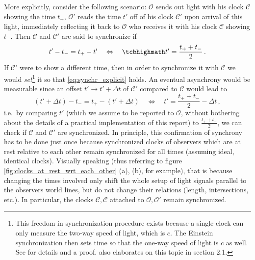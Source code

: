 More explicitly, consider the following scenario: $\mathcal{O}$ sends out light with his clock $\mathcal{C}$ showing the time $t_+$, $\mathcal{O}'$ reads the time $t'$ off of his clock $\mathcal{C}'$ upon arrival of this light, immediately reflecting it back to $\mathcal{O}$ who receives it with his clock $\mathcal{C}$ showing $t_-$. Then $\mathcal{C}$ and $\mathcal{C}'$ are said to synchronize if
\begin{equation}\label{eq:synchr_explicit}
	t' - t_- = t_+ - t'
	\quad \Leftrightarrow \quad
	\eqbox{
	t' = \frac{t_+ + t_-}{2}
	}
	\, .
\end{equation}
If $\mathcal{C}'$ were to show a different time, then in order to synchronize it with $\mathcal{C}$ we would \emph{set}\footnote{This freedom in synchronization procedure exists because a single clock can only measure the two-way speed of light, which is $c$. The Einstein synchronization then sets time so that the one-way speed of light is $c$ as well. See \cite{Minguzzi_2003} for details and a proof. \cite{giulini_srt} also elaborates on this topic in section 2.1.} it so that \eqref{eq:synchr_explicit} holds.
 An eventual asynchrony would be measurable since an offset $t' \rightarrow t' + \Delta t$ of $\mathcal{C}'$ compared to $\mathcal{C}$ would lead to
\begin{equation}\label{eq:synchr_offset}
	(t' + \Delta t) - t_- = t_+ - (t' + \Delta t)
	\quad \Leftrightarrow \quad
	t' = \frac{t_+ + t_-}{2} - \Delta t \, ,
\end{equation}
i.e.~by comparing $t'$ (which we assume to be reported to $\mathcal{O}$, without bothering about the details of a practical implementation of this report) to $\frac{t_+ + t_-}{2}$, we can check if $\mathcal{C}$ and $\mathcal{C}'$ are synchronized. In principle, this confirmation of synchrony has to be done just once because synchronized clocks of observers which are at rest relative to each other remain synchronized for all times (assuming ideal, identical clocks). Visually speaking (thus referring to figure \ref{fig:clocks_at_rest_wrt_each_other} (a), (b), for example), that is because changing the times involved only shift the whole setup of light signals parallel to the observers world lines, but do not change their relations (length, intersections, etc.). In particular, the clocks $\mathcal{C}, \mathcal{C}$ attached to $\mathcal{O}, \mathcal{O}'$ remain synchronized.


